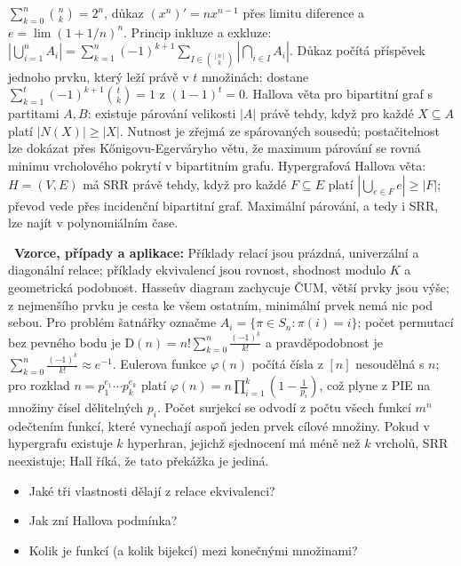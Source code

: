 \begin{odpoved}
$\sum_{k=0}^n\binom nk=2^n$, důkaz $(x^n)'=nx^{n-1}$ přes limitu diference a
$e=\lim(1+1/n)^n$. Princip inkluze a exkluze:
$|\bigcup_{i=1}^nA_i|=\sum_{k=1}^n(-1)^{k+1}
\sum_{I\in\binom{[n]}k}|\bigcap_{i\in I}A_i|$. Důkaz počítá příspěvek jednoho prvku,
který leží právě v $t$ množinách: dostane
$\sum_{k=1}^t(-1)^{k+1}\binom tk=1$ z $(1-1)^t=0$. Hallova věta pro bipartitní graf
s partitami $A,B$: existuje párování velikosti $|A|$ právě tehdy, když pro každé
$X\subseteq A$ platí $|N(X)|\ge |X|$. Nutnost je zřejmá ze spárovaných sousedů;
postačitelnost lze dokázat přes Kőnigovu-Egerváryho větu, že maximum párování se rovná
minimu vrcholového pokrytí v bipartitním grafu. Hypergrafová Hallova věta: $H=(V,E)$
má SRR právě tehdy, když pro každé $F\subseteq E$ platí
$|\bigcup_{e\in F}e|\ge |F|$; převod vede přes incidenční bipartitní graf. Maximální
párování, a tedy i SRR, lze najít v polynomiálním čase.\par
\noindent{}\ \textbf{Vzorce, případy a aplikace:} Příklady relací jsou prázdná,
univerzální a diagonální relace; příklady ekvivalencí jsou rovnost, shodnost modulo $K$
a geometrická podobnost. Hasseův diagram zachycuje ČUM, větší prvky jsou výše; z
nejmenšího prvku je cesta ke všem ostatním, minimální prvek nemá nic pod sebou. Pro
problém šatnářky označme $A_i=\{\pi\in S_n:\pi(i)=i\}$; počet permutací bez pevného
bodu je
$\mathrm{D}(n)=n!\sum_{k=0}^n\frac{(-1)^k}{k!}$ a pravděpodobnost je
$\sum_{k=0}^n\frac{(-1)^k}{k!}\approx e^{-1}$. Eulerova funkce $\varphi(n)$ počítá
čísla z $[n]$ nesoudělná s $n$; pro rozklad
$n=p_1^{e_1}\cdots p_k^{e_k}$ platí
$\varphi(n)=n\prod_{i=1}^k(1-\frac1{p_i})$, což plyne z PIE na množiny čísel dělitelných
$p_i$. Počet surjekcí se odvodí z počtu všech funkcí $m^n$ odečtením funkcí, které
vynechají aspoň jeden prvek cílové množiny. Pokud v hypergrafu existuje $k$ hyperhran,
jejichž sjednocení má méně než $k$ vrcholů, SRR neexistuje; Hall říká, že tato překážka
je jediná.
\end{odpoved}
\begin{recall}
\begin{itemize}[leftmargin=1.2em,itemsep=0pt,topsep=1pt]
  \item Jaké tři vlastnosti dělají z relace ekvivalenci?
  \item Jak zní Hallova podmínka?
  \item Kolik je funkcí (a kolik bijekcí) mezi konečnými množinami?
\end{itemize}
\end{recall}

